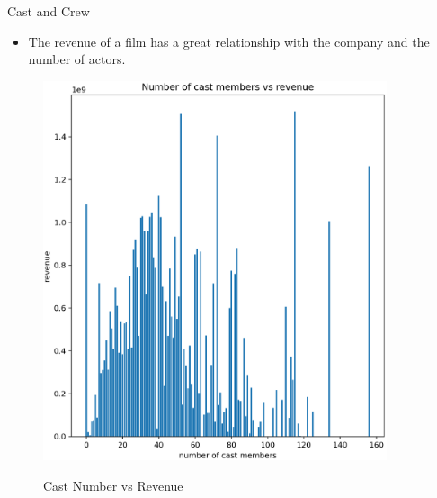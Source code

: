 \documentclass[
 size=14pt,
 paper=smartboard,  %
 mode=present, 		%
 display=slides, 	%
 style=tuliplab,  	%
 pauseslide,
 fleqn,leqno]{powerdot}
\begin{document}
\begin{slide}[toc=,bm=]{Cast and Crew}
  \begin{itemize}
    \item The revenue of a film has a great relationship with 
    the company and the number of actors.
  \end{itemize}
  \begin{figure}[htbp]
    \centering
    \begin{minipage}[t]{0.48\textwidth}
      \centering
      \includegraphics[width=0.9\textwidth]{figures//cest.eps}\\
      \vspace{-1.4em}
      \caption{Cast Number vs Revenue}
    \end{minipage}
    \begin{minipage}[t]{0.48\textwidth}
      \centering

\end{minipage}
\end{figure}
\end{slide}
\end{document}
